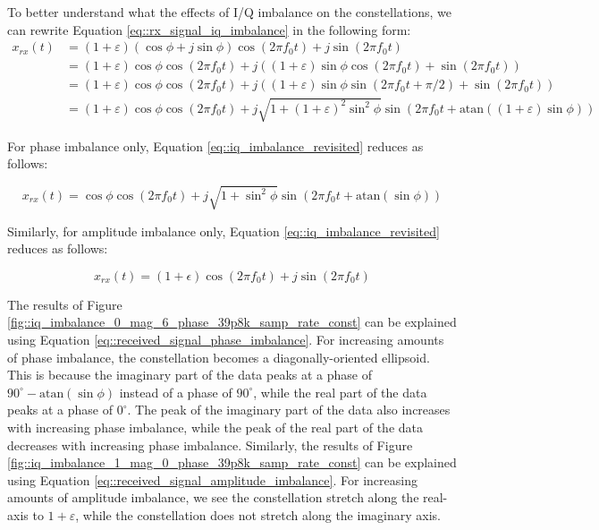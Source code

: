 \documentclass{article}
\begin{document}
To better understand what the effects of I/Q imbalance on the constellations, we can rewrite Equation \ref{eq::rx_signal_iq_imbalance} in the following form:
\begin{align}
	x_{rx}(t) &= (1+\varepsilon)(\cos\phi + j\sin\phi)\cos(2{\pi}f_0t) + j\sin(2{\pi}f_0t) \\[6 pt]
	&= (1+\varepsilon)\cos\phi\cos(2{\pi}f_0t) + j((1+\varepsilon)\sin\phi\cos(2{\pi}f_0t) + \sin(2{\pi}f_0t)) \\[6 pt]
	&= (1+\varepsilon)\cos\phi\cos(2{\pi}f_0t) + j((1+\varepsilon)\sin\phi\sin(2{\pi}f_0t + \pi/2) + \sin(2{\pi}f_0t)) \\
	&= (1+\varepsilon)\cos\phi\cos(2{\pi}f_0t) + j\sqrt{1+(1+\varepsilon)^2\sin^2\phi}\sin(2{\pi}f_0t + \text{atan}((1+\varepsilon)\sin\phi)) \label{eq::iq_imbalance_revisited}
\end{align}

For phase imbalance only, Equation \ref{eq::iq_imbalance_revisited} reduces as follows:

\begin{equation}
	x_{rx}(t) = \cos\phi\cos(2{\pi}f_0t) + j\sqrt{1+\sin^2\phi}\sin(2{\pi}f_0t + \text{atan}(\sin\phi)) \label{eq::received_signal_phase_imbalance}
\end{equation}

Similarly, for amplitude imbalance only, Equation \ref{eq::iq_imbalance_revisited} reduces as follows:

\begin{equation}
	x_{rx}(t) = (1+\epsilon)\cos(2{\pi}f_0t) + j\sin(2{\pi}f_0t)
\label{eq::received_signal_amplitude_imbalance}
\end{equation}

The results of Figure \ref{fig::iq_imbalance_0_mag_6_phase_39p8k_samp_rate_const} can be explained using Equation \ref{eq::received_signal_phase_imbalance}. For increasing amounts of phase imbalance, the constellation becomes a diagonally-oriented ellipsoid. This is because the imaginary part of the data peaks at a phase of $90^{\circ} - \text{atan}(\sin\phi)$ instead of a phase of $90^{\circ}$, while the real part of the data peaks at a phase of $0^{\circ}$. The peak of the imaginary part of the data also increases with increasing phase imbalance, while the peak of the real part of the data decreases with increasing phase imbalance. Similarly, the results of Figure \ref{fig::iq_imbalance_1_mag_0_phase_39p8k_samp_rate_const} can be explained using Equation \ref{eq::received_signal_amplitude_imbalance}. For increasing amounts of amplitude imbalance, we see the constellation stretch along the real-axis to $1+\varepsilon$, while the constellation does not stretch along the imaginary axis.
\end{document}
